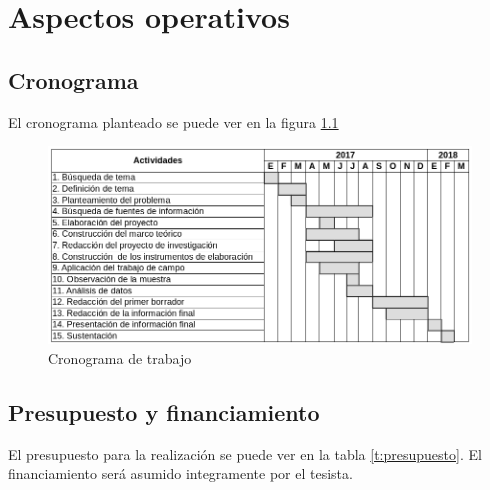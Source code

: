 \chapter{Aspectos operativos}
\section{Cronograma}
El cronograma planteado se puede ver en la figura \ref{fig:cronograma}

\begin{figure}[h]
    \centering
    \captionsetup{justification=centering}
    \includegraphics[width=1.0\textwidth]{Imagenes/Bitmap/cronograma}
    \caption{Cronograma de trabajo}
    \label{fig:cronograma}
\end{figure}

\section{Presupuesto y financiamiento}
El presupuesto para la realizaci\'on se puede ver en la tabla \ref{t:presupuesto}.
El financiamiento ser\'a asumido integramente por el tesista.

